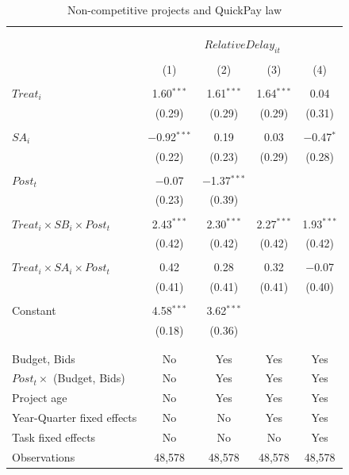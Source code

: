 \documentclass[
]{article}
\begin{document}
\begin{table}[H] \centering 
  \caption{Non-competitive projects and QuickPay law} 
  \label{} 
\small 
\begin{tabular}{@{\extracolsep{-2pt}}lcccc} 
\\[-1.8ex]\hline 
\hline \\[-1.8ex] 
\\[-1.8ex] & \multicolumn{4}{c}{$RelativeDelay_{it}$} \\ 
\\[-1.8ex] & (1) & (2) & (3) & (4)\\ 
\hline \\[-1.8ex] 
 $Treat_i$ & 1.60$^{***}$ & 1.61$^{***}$ & 1.64$^{***}$ & 0.04 \\ 
  & (0.29) & (0.29) & (0.29) & (0.31) \\ 
  & & & & \\ 
 $SA_i$ & $-$0.92$^{***}$ & 0.19 & 0.03 & $-$0.47$^{*}$ \\ 
  & (0.22) & (0.23) & (0.29) & (0.28) \\ 
  & & & & \\ 
 $Post_t$ & $-$0.07 & $-$1.37$^{***}$ &  &  \\ 
  & (0.23) & (0.39) &  &  \\ 
  & & & & \\ 
 $Treat_i \times SB_i \times Post_t$ & 2.43$^{***}$ & 2.30$^{***}$ & 2.27$^{***}$ & 1.93$^{***}$ \\ 
  & (0.42) & (0.42) & (0.42) & (0.42) \\ 
  & & & & \\ 
 $Treat_i \times SA_i \times Post_t$ & 0.42 & 0.28 & 0.32 & $-$0.07 \\ 
  & (0.41) & (0.41) & (0.41) & (0.40) \\ 
  & & & & \\ 
 Constant & 4.58$^{***}$ & 3.62$^{***}$ &  &  \\ 
  & (0.18) & (0.36) &  &  \\ 
  & & & & \\ 
\hline \\[-1.8ex] 
Budget, Bids & No & Yes & Yes & Yes \\ 
$Post_t \times $  (Budget, Bids) & No & Yes & Yes & Yes \\ 
Project age & No & Yes & Yes & Yes \\ 
Year-Quarter fixed effects & No & No & Yes & Yes \\ 
Task fixed effects & No & No & No & Yes \\ 
Observations & 48,578 & 48,578 & 48,578 & 48,578 \\ 

\end{tabular}
\end{table}
\end{document}
